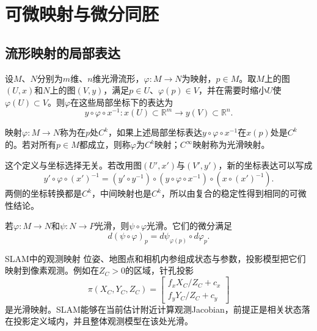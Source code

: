 
\section{可微映射与微分同胚}

\subsection{流形映射的局部表达}

设$M$、$N$分别为$m$维、$n$维光滑流形，$\varphi:M\to N$为映射，$p\in M$。取$M$上的图$(U,x)$和$N$上的图$(V,y)$，满足$p\in U$、$\varphi(p)\in V$，并在需要时缩小$U$使$\varphi(U)\subset V$。则$\varphi$在这些局部坐标下的表达为
\[
    y\circ\varphi\circ x^{-1}:
    x(U)\subset\mathbb R^m\to y(V)\subset\mathbb R^n.
\]

\begin{center}
\end{center}

\begin{definition}[$C^k$映射]
映射$\varphi:M\to N$称为在$p$处$C^k$，如果上述局部坐标表达$y\circ\varphi\circ x^{-1}$在$x(p)$处是$C^k$的。若对所有$p\in M$都成立，则称$\varphi$为$C^k$映射；$C^\infty$映射称为光滑映射。
\end{definition}

这个定义与坐标选择无关。若改用图$(U',x')$与$(V',y')$，新的坐标表达可以写成
\[
    y'\circ\varphi\circ(x')^{-1}
    =
    (y'\circ y^{-1})
    \circ(y\circ\varphi\circ x^{-1})
    \circ(x\circ(x')^{-1}).
\]
两侧的坐标转换都是$C^k$，中间映射也是$C^k$，所以由复合的稳定性得到相同的可微性结论。

\begin{theorem}[光滑复合与链式法则]
若$\varphi:M\to N$和$\psi:N\to P$光滑，则$\psi\circ\varphi$光滑。它们的微分满足
\[
    d(\psi\circ\varphi)_p
    =d\psi_{\varphi(p)}\circ d\varphi_p.
\]
\end{theorem}

\begin{slamcase}{SLAM中的观测映射}
位姿、地图点和相机内参组成状态与参数，投影模型把它们映射到像素观测。例如在$Z_C>0$的区域，针孔投影
\[
    \pi(X_C,Y_C,Z_C)
    =
    \begin{bmatrix}
        f_xX_C/Z_C+c_x\\
        f_yY_C/Z_C+c_y
    \end{bmatrix}
\]
是光滑映射。SLAM能够在当前估计附近计算观测Jacobian，前提正是相关状态落在投影定义域内，并且整体观测模型在该处光滑。
\end{slamcase}

